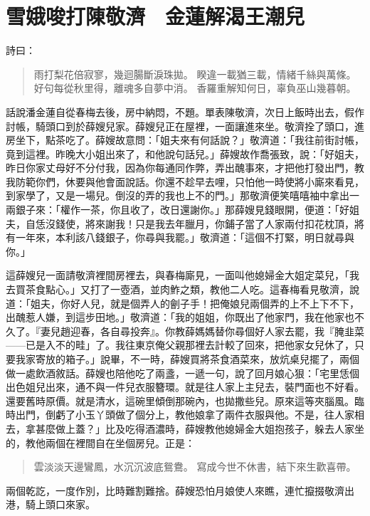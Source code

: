 
\chapter{雪娥唆打陳敬濟　金蓮解渴王潮兒}

詩曰：
\begin{quote}
雨打梨花倍寂寥，幾迴腸斷淚珠拋。
睽違一載猶三載，情緒千絲與萬條。
好句每從秋里得，離魂多自夢中消。
香羅重解知何日，辜負巫山幾暮朝。
\end{quote}

話說潘金蓮自從春梅去後，房中納悶，不題。單表陳敬濟，次日上飯時出去，假作討帳，騎頭口到於薛嫂兒家。薛嫂兒正在屋裡，一面讓進來坐。敬濟拴了頭口，進房坐下，點茶吃了。薛嫂故意問：「姐夫來有何話說？」敬濟道：「我往前街討帳，竟到這裡。昨晚大小姐出來了，和他說句話兒。」薛嫂故作喬張致，說：「好姐夫，昨日你家丈母好不分付我，因為你每通同作弊，弄出醜事來，才把他打發出門，教我防範你們，休要與他會面說話。你還不趁早去哩，只怕他一時使將小廝來看見，到家學了，又是一場兒。倒沒的弄的我也上不的門。」那敬濟便笑嘻嘻袖中拿出一兩銀子來：「權作一茶，你且收了，改日還謝你。」那薛嫂見錢眼開，便道：「好姐夫，自恁沒錢使，將來謝我！只是我去年臘月，你鋪子當了人家兩付扣花枕頂，將有一年來，本利該八錢銀子，你尋與我罷。」敬濟道：「這個不打緊，明日就尋與你。」

這薛嫂兒一面請敬濟裡間房裡去，與春梅廝見，一面叫他媳婦金大姐定菜兒，「我去買茶食點心。」又打了一壺酒，並肉鮓之類，教他二人吃。這春梅看見敬濟，說道：「姐夫，你好人兒，就是個弄人的劊子手！把俺娘兒兩個弄的上不上下不下，出醜惹人嫌，到這步田地。」敬濟道：「我的姐姐，你既出了他家門，我在他家也不久了。『妻兒趙迎春，各自尋投奔』。你教薛媽媽替你尋個好人家去罷，我『腌韭菜——已是入不的畦」了。我往東京俺父親那裡去計較了回來，把他家女兒休了，只要我家寄放的箱子。」說畢，不一時，薛嫂買將茶食酒菜來，放炕桌兒擺了，兩個做一處飲酒敘話。薛嫂也陪他吃了兩盞，一遞一句，說了回月娘心狠：「宅里恁個出色姐兒出來，通不與一件兒衣服簪環。就是往人家上主兒去，裝門面也不好看。還要舊時原價。就是清水，這碗里傾倒那碗內，也拋撒些兒。原來這等夾腦風。臨時出門，倒虧了小玉丫頭做了個分上，教他娘拿了兩件衣服與他。不是，往人家相去，拿甚麼做上蓋？」比及吃得酒濃時，薛嫂教他媳婦金大姐抱孩子，躲去人家坐的，教他兩個在裡間自在坐個房兒。正是：
\begin{quote}
雲淡淡天邊鸞鳳，水沉沉波底鴛鴦。
寫成今世不休書，結下來生歡喜帶。
\end{quote}

兩個乾訖，一度作別，比時難割難捨。薛嫂恐怕月娘使人來瞧，連忙攛掇敬濟出港，騎上頭口來家。

